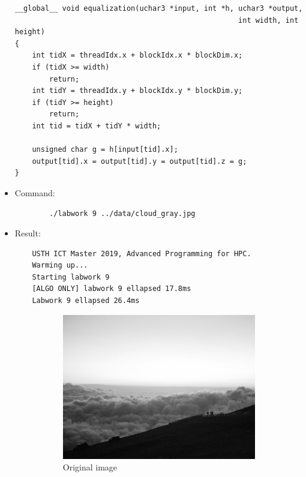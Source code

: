 \documentclass{article}
\begin{document}
\begin{itemize}
\begin{verbatim}
__global__ void equalization(uchar3 *input, int *h, uchar3 *output, 
                                                    int width, int height)
{
    int tidX = threadIdx.x + blockIdx.x * blockDim.x;
    if (tidX >= width)
        return;
    int tidY = threadIdx.y + blockIdx.y * blockDim.y;
    if (tidY >= height)
        return;
    int tid = tidX + tidY * width;

    unsigned char g = h[input[tid].x];
    output[tid].x = output[tid].y = output[tid].z = g;
}
    \end{verbatim}
    \item Command:
    \begin{verbatim}
        ./labwork 9 ../data/cloud_gray.jpg 
    \end{verbatim}
    \item Result:
    \begin{verbatim}
    USTH ICT Master 2019, Advanced Programming for HPC.
    Warming up...
    Starting labwork 9
    [ALGO ONLY] labwork 9 ellapsed 17.8ms
    Labwork 9 ellapsed 26.4ms
    \end{verbatim}
    \begin{figure}[h]
      \centering
      \begin{subfigure}{.45\textwidth}
        \includegraphics[width=\linewidth]{./result/cloud_gray.jpg}
        \caption{Original image}
      \end{subfigure}
      \hspace{1cm}
      \begin{subfigure}{.45\textwidth}

\end{subfigure}
\end{figure}
\end{itemize}
\end{document}

